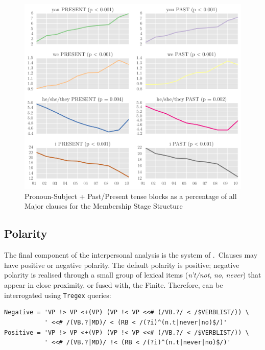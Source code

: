 \begin{figure}[htb]
\centering
\includegraphics[width=1\textwidth]{../images/subj-ten-const-p.png}
\caption[Pronoun-Subject + Past\slash Present tense blocks]{Pronoun-Subject + Past\slash Present tense blocks as a percentage of all Major clauses for the Membership Stage Structure}
\label{fig:tense_constellations}
\end{figure}

\subsection{Polarity}

The final component of the interpersonal analysis is the system of .~Clauses may have positive or negative polarity. The default polarity is positive; negative polarity is realised through a small group of lexical items (\emph{n't\slash not}, \emph{no}, \emph{never}) that appear in close proximity, or fused with, the Finite. Therefore,  can be interrogated using \texttt{Tregex} queries:

\begin{verbatim}
Negative = 'VP !> VP <+(VP) (VP !< VP <<# (/VB.?/ < /$VERBLIST/)) \
           ' <<# /(VB.?|MD)/ < (RB < /(?i)^(n.t|never|no)$/)'
Positive = 'VP !> VP <+(VP) (VP !< VP <<# (/VB.?/ < /$VERBLIST/)) \
           ' <<# /(VB.?|MD)/ !< (RB < /(?i)^(n.t|never|no)$/)'
\end{verbatim}


